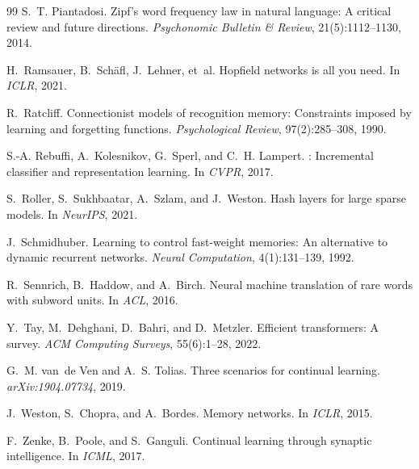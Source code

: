 \documentclass[11pt,a4paper]{article}
\begin{document}
\begin{thebibliography}{99}
S.~T. Piantadosi.
\newblock Zipf's word frequency law in natural language: A critical review and
future directions.
\newblock \emph{Psychonomic Bulletin \& Review}, 21(5):1112--1130, 2014.

H.~Ramsauer, B.~Sch\"{a}fl, J.~Lehner, et~al.
\newblock Hopfield networks is all you need.
\newblock In \emph{ICLR}, 2021.

R.~Ratcliff.
\newblock Connectionist models of recognition memory: Constraints imposed by
learning and forgetting functions.
\newblock \emph{Psychological Review}, 97(2):285--308, 1990.

S.-A. Rebuffi, A.~Kolesnikov, G.~Sperl, and C.~H. Lampert.
: Incremental classifier and representation learning.
\newblock In \emph{CVPR}, 2017.

S.~Roller, S.~Sukhbaatar, A.~Szlam, and J.~Weston.
\newblock Hash layers for large sparse models.
\newblock In \emph{NeurIPS}, 2021.

J.~Schmidhuber.
\newblock Learning to control fast-weight memories: An alternative to dynamic
recurrent networks.
\newblock \emph{Neural Computation}, 4(1):131--139, 1992.

R.~Sennrich, B.~Haddow, and A.~Birch.
\newblock Neural machine translation of rare words with subword units.
\newblock In \emph{ACL}, 2016.

Y.~Tay, M.~Dehghani, D.~Bahri, and D.~Metzler.
\newblock Efficient transformers: A survey.
\newblock \emph{ACM Computing Surveys}, 55(6):1--28, 2022.

G.~M. van~de Ven and A.~S. Tolias.
\newblock Three scenarios for continual learning.
\newblock \emph{arXiv:1904.07734}, 2019.

J.~Weston, S.~Chopra, and A.~Bordes.
\newblock Memory networks.
\newblock In \emph{ICLR}, 2015.

F.~Zenke, B.~Poole, and S.~Ganguli.
\newblock Continual learning through synaptic intelligence.
\newblock In \emph{ICML}, 2017.


\end{thebibliography}
\end{document}
